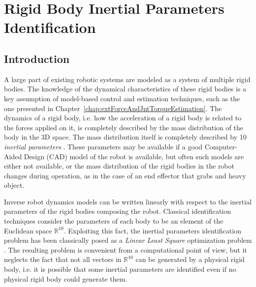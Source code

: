 \chapter{Rigid Body Inertial Parameters Identification}
\label{ch:inertialParameters}
\graphicspath{{Chapter60SingleBodyInertialParameters/Figs/}}

\section{Introduction}
A large part of existing robotic systems are modeled as a system of multiple rigid bodies. 
The knowledge of the dynamical characteristics of these rigid bodies is a key assumption of model-based control and estimation techniques, such as the one presented in Chapter~\ref{chap:extForceAndJntTorqueEstimation}. The dynamics of a rigid body, i.e. how the acceleration of a rigid body is related to the forces applied on it, is completely described by the mass distribution of the body in the 3D space. 
The mass distribution itself is completely described by 10 \emph{inertial parameters} \citep{handbookident}. These parameters may be available if a good Computer-Aided Design (CAD) model of the robot is available, but often such models are either not available, or the mass distribution of the rigid bodies in the robot changes during operation, as in the case of an end effector that grabs and heavy object. 


 Inverse robot dynamics models can be written linearly with respect to the inertial parameters of the rigid bodies composing the robot. Classical identification techniques \citep{handbookident,ayusawa2013} consider the parameters of each body to be an element of the Euclidean space $\mathbb{R}^{10}$. Exploiting this fact, the inertial parameters identification problem has been classically posed as a \emph{Linear Least Square} optimization problem \citep{handbookident}. The resulting problem is convenient from a computational point of view, but it neglects the fact that not all vectors in $\mathbb{R}^{10}$ can be generated by a physical rigid body, i.e. it is possible that some inertial parameters are identified even if no physical rigid body could generate them. 

